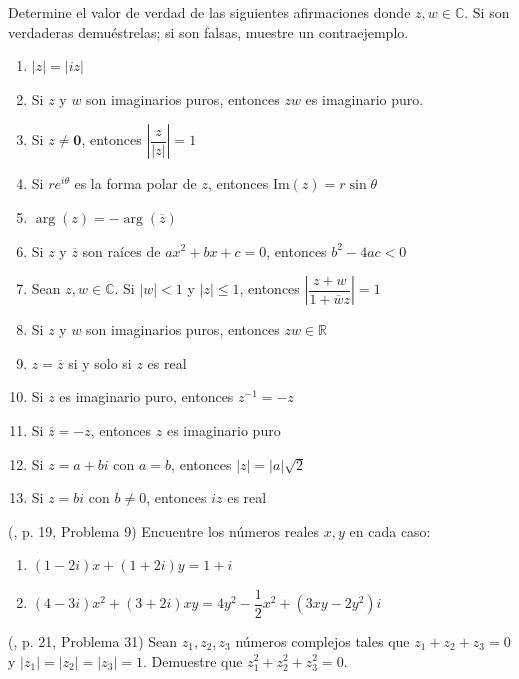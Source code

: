 \begin{prob} 
Determine el valor de verdad de las siguientes afirmaciones donde $z, w \in \mathbb{C}$. Si son verdaderas demuéstrelas; si son falsas, muestre un contraejemplo.

\begin{enumerate}[$a)$]
\item  $|z|=|iz|$
\item  Si $z$ y $w$ son imaginarios puros, entonces $zw$ es imaginario puro.
\item  Si $z\neq \mathbf{0}$, entonces $\left|\dfrac{z}{|z|}\right|=1$
\item  Si $re^{i\theta}$ es la forma polar de $z$, entonces $\text{Im}(z)=r\sin \theta$
\item $\arg(z)=-\arg(\overline{z})$
\item  Si $z$ y $\overline{z}$ son raíces de $ax^2+bx+c=0$, entonces $b^2-4ac<0$
\item  Sean $z, w\in \mathbb{C}$. Si $|w|<1$ y $|z|\leq 1$, entonces $\left|\dfrac{z+w}{1+\overline{w}z}\right|=1$
\item  Si $z$ y $w$ son imaginarios puros, entonces $zw\in \mathbb{R}$
\item  $z=\overline{z}$ si y solo si $z$ es real
\item  Si $z$ es imaginario puro, entonces $z^{-1}=-z$
\item  Si $\overline{z}=-z$, entonces $z$ es imaginario puro
\item  Si $z=a+bi$ con $a=b$, entonces $|z|=|a|\sqrt{2}$
\item  Si $z=bi$ con $b\neq 0$, entonces $iz$ es real
\end{enumerate}
\end{prob}

\begin{prob} 
(\cite{andreescu2014complex}, p. 19, Problema 9) Encuentre los números reales $x, y$ en cada caso:

\begin{enumerate}[$a)$]
\item $(1-2i)x + (1+2i)y=1+i$
\item $(4-3i)x^2+(3+2i)xy=4y^2-\dfrac{1}{2}x^2+(3xy-2y^2)i$
\end{enumerate}
\end{prob}

\begin{prob} 
(\cite{andreescu2014complex}, p. 21, Problema 31) Sean $z_1, z_2, z_3$ números complejos tales que $z_1+z_2+z_3=0$ y $|z_1|=|z_2|=|z_3|=1$. Demuestre que $z_1^2+z_2^2+z_3^2=0$.
\end{prob}

